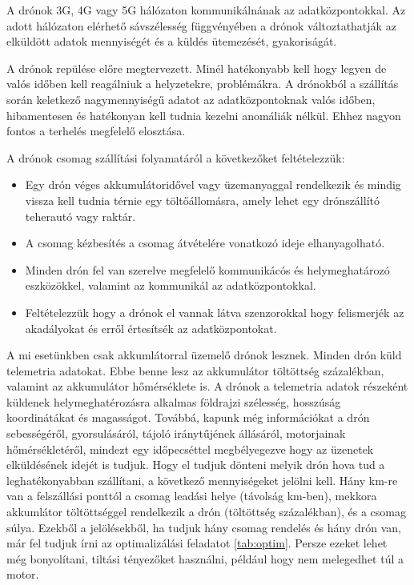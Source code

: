 A drónok 3G, 4G vagy 5G hálózaton kommunikálnának az adatközpontokkal.
Az adott hálózaton elérhető sávszélesség függvényében a drónok változtathatják az elküldött adatok mennyiségét és a küldés ütemezését, gyakoriságát.

A drónok repülése előre megtervezett. Minél hatékonyabb kell hogy legyen de valós időben kell reagálniuk a helyzetekre, problémákra.
A drónokból a szállítás során keletkező nagymennyiségű adatot az adatközpontoknak valós időben, hibamentesen
és hatékonyan kell tudnia kezelni anomáliák nélkül.
Ehhez nagyon fontos a terhelés megfelelő elosztása.

A drónok csomag szállítási folyamatáról a következőket feltételezzük:
\begin{itemize}
    \item Egy drón  véges akkumulátoridővel vagy üzemanyaggal rendelkezik és mindig vissza kell tudnia térnie egy töltőállomásra, amely lehet egy drónszállító teherautó vagy raktár.
    \item A csomag kézbesítés a csomag átvételére vonatkozó ideje elhanyagolható.
    \item Minden drón fel van szerelve megfelelő kommunikácós és helymeghatározó eszközökkel, valamint az kommunikál az adatközpontokkal.
    \item Feltételezzük hogy a drónok el vannak látva szenzorokkal hogy felismerjék az akadályokat és erről értesítsék az adatközpontokat.
\end{itemize}

A mi esetünkben csak akkumlátorral üzemelő drónok lesznek.
Minden drón küld telemetria adatokat.
Ebbe benne lesz az akkumulátor töltöttség százalékban, valamint az akkumulátor hőmérséklete is.
A drónok a telemetria adatok részeként küldenek helymeghatérozásra alkalmas földrajzi szélesség, hosszúság koordinátákat és magasságot.
Továbbá, kapunk még információkat a drón sebességéről,
gyorsulásáról, tájoló iránytűjének állásáról, motorjainak hőmérsékletéről, mindezt egy időpecséttel megbélyegezve hogy az üzenetek elküldésének idejét is tudjuk.
Hogy el tudjuk dönteni melyik drón hova tud a leghatékonyabban szállítani, a következő mennyiségeket jelölni kell. Hány km-re van a felszállási ponttól a csomag leadási helye (távolság km-ben),
mekkora akkumlátor töltöttséggel rendelkezik a drón (töltöttség százalékban), és a csomag súlya.
Ezekből a jelölésekből, ha tudjuk hány csomag rendelés és hány drón van, már fel tudjuk írni az optimalizálási feladatot \ref{tab:optim}.
Persze ezeket lehet még bonyolítani, tiltási tényezőket használni, például hogy nem melegedhet túl a motor.

